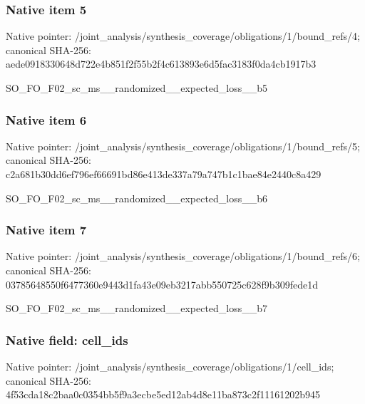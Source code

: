 \documentclass[10pt,a4paper]{article}
\begin{document}
\subsubsection{Native item 5}
Native pointer: /joint\_\allowbreak{}analysis/synthesis\_\allowbreak{}coverage/obligations/1/bound\_\allowbreak{}refs/4; canonical SHA-256: aede0918330648d722e4b851f2f55b2f4c613893e6d5fac3183f0da4cb1917b3

\begingroup\raggedright\sloppy SO\_\allowbreak{}FO\_\allowbreak{}F02\_\allowbreak{}sc\_\allowbreak{}ms\_\allowbreak{}\_\allowbreak{}randomized\_\allowbreak{}\_\allowbreak{}expected\_\allowbreak{}loss\_\allowbreak{}\_\allowbreak{}b5\par\endgroup

\subsubsection{Native item 6}
Native pointer: /joint\_\allowbreak{}analysis/synthesis\_\allowbreak{}coverage/obligations/1/bound\_\allowbreak{}refs/5; canonical SHA-256: c2a681b30dd6ef796ef66691bd86e413de337a79a747b1c1bae84e2440c8a429

\begingroup\raggedright\sloppy SO\_\allowbreak{}FO\_\allowbreak{}F02\_\allowbreak{}sc\_\allowbreak{}ms\_\allowbreak{}\_\allowbreak{}randomized\_\allowbreak{}\_\allowbreak{}expected\_\allowbreak{}loss\_\allowbreak{}\_\allowbreak{}b6\par\endgroup

\subsubsection{Native item 7}
Native pointer: /joint\_\allowbreak{}analysis/synthesis\_\allowbreak{}coverage/obligations/1/bound\_\allowbreak{}refs/6; canonical SHA-256: 03785648550f6477360e9443d1fa43e09eb3217abb550725c628f9b309fede1d

\begingroup\raggedright\sloppy SO\_\allowbreak{}FO\_\allowbreak{}F02\_\allowbreak{}sc\_\allowbreak{}ms\_\allowbreak{}\_\allowbreak{}randomized\_\allowbreak{}\_\allowbreak{}expected\_\allowbreak{}loss\_\allowbreak{}\_\allowbreak{}b7\par\endgroup

\subsubsection{Native field: cell\_\allowbreak{}ids}
Native pointer: /joint\_\allowbreak{}analysis/synthesis\_\allowbreak{}coverage/obligations/1/cell\_\allowbreak{}ids; canonical SHA-256: 4f53cda18c2baa0c0354bb5f9a3ecbe5ed12ab4d8e11ba873c2f11161202b945
\end{document}
